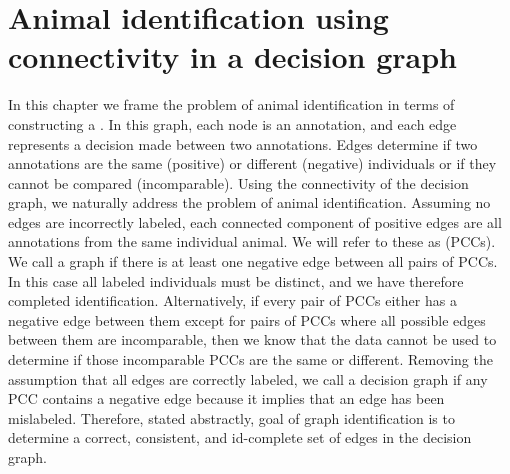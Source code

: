 \begin{comment}
fixtex --fpaths chapter5-graphid.tex --outline --asmarkdown --numlines=999 --shortcite

fixtex --fpaths chapter5-graphid.tex --outline --asmarkdown --numlines=999 --shortcite -w && ./checklang.py outline_chapter5-graphid.md

fixtex --fpaths chapter1-intro.tex --outline --asmarkdown --numlines=999 --shortcite -w && ./checklang.py outline_chapter1-intro.md
\end{comment}



\chapter{Animal identification using connectivity in a decision graph}\label{chap:graphid}
\newcommand{\nT}{N}

In this chapter we frame the problem of animal identification in terms of constructing a %
.
In this graph, each node is an annotation, and each edge represents a decision made between two annotations.
Edges determine if two annotations are the same (positive) or different (negative) individuals or if they cannot
  be compared (incomparable).
Using the connectivity of the decision graph, we naturally address the problem of animal identification.
Assuming no edges are incorrectly labeled, each connected component of positive edges are all annotations from
  the same individual animal.
We will refer to these as  (PCCs).
We call a graph  if there is at least one negative edge between all pairs of PCCs.
In this case all labeled individuals must be distinct, and we have therefore completed identification.
Alternatively, if every pair of PCCs either has a negative edge between them except for pairs of PCCs where all
  possible edges between them are incomparable, then we know that the data cannot be used to determine if those
  incomparable PCCs are the same or different.
Removing the assumption that all edges are correctly labeled, we call a decision graph 
  if any PCC contains a negative edge because it implies that an edge has been mislabeled.
Therefore, stated abstractly, goal of graph identification is to determine a correct, consistent, and id-complete
  set of edges in the decision graph.


